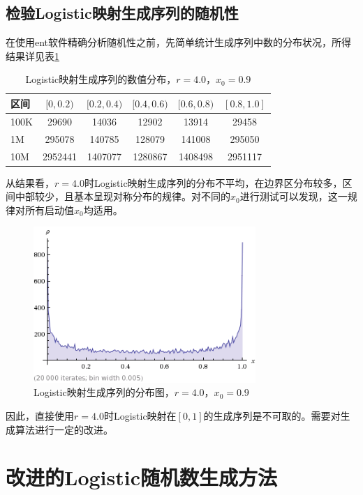 \documentclass[UTF8]{ctexart}
\begin{document}
\subsection{检验Logistic映射生成序列的随机性}
在使用ent软件精确分析随机性之前，先简单统计生成序列中数的分布状况，所得结果详见表\ref{naivedistribution}

\begin{table}[h]
\centering
\caption{Logistic映射生成序列的数值分布，$r=4.0$，$x_0=0.9$}
\label{naivedistribution}
\begin{tabular}{ l || c c c c c}
区间       & $[0, 0.2)$ & $[0.2, 0.4)$   & $[0.4, 0.6)$  & $[0.6, 0.8)$ & $[0.8, 1.0]$ \\ \hline
100K & 29690 & 14036 & 12902 & 13914 & 29458  \\
1M   & 295078 & 140785 & 128079 & 141008 & 295050 \\
10M & 2952441 & 1407077 & 1280867 & 1408498 & 2951117
\end{tabular}
\end{table}

从结果看，$r=4.0$时Logistic映射生成序列的分布不平均，在边界区分布较多，区间中部较少，且基本呈现对称分布的规律。对不同的$x_0$进行测试可以发现，这一规律对所有启动值$x_0$均适用。

\begin{figure}[h]
\caption{Logistic映射生成序列的分布图，$r=4.0$，$x_0=0.9$}
\centering
\includegraphics[width=0.75\textwidth]{logdist}
\end{figure}

因此，直接使用$r=4.0$时Logistic映射在$[0, 1]$的生成序列是不可取的。需要对生成算法进行一定的改进。

\section{改进的Logistic随机数生成方法}
\end{document}
